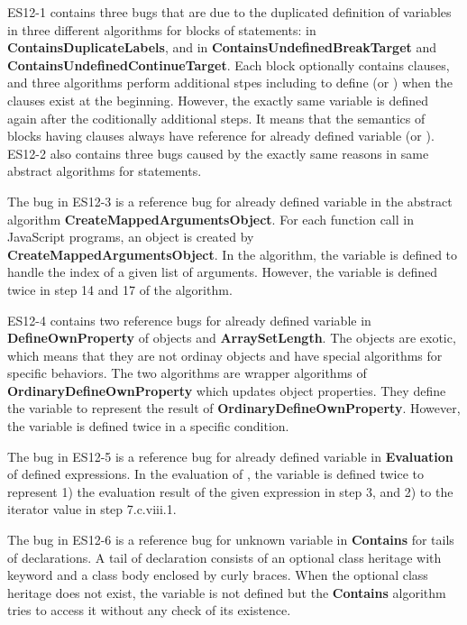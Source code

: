 ES12-1 contains three bugs that are due to the duplicated definition of
variables in three different algorithms for  blocks of
 statements:  in
\textbf{ContainsDuplicateLabels}, and  in
\textbf{ContainsUndefinedBreakTarget} and
\textbf{ContainsUndefinedContinueTarget}.  Each  block optionally
contains  clauses, and three algorithms perform additional stpes
including to define  (or ) when the
clauses exist at the beginning.  However, the exactly same variable is defined
again after the coditionally additional steps.  It means that the semantics of
 blocks having  clauses always have reference for
already defined variable  (or ).
ES12-2 also contains three bugs caused by the exactly same reasons in same
abstract algorithms for  statements.

The bug in ES12-3 is a reference bug for already defined variable 
in the abstract algorithm \textbf{CreateMappedArgumentsObject}.  For each
function call in JavaScript programs, an  object is created by
\textbf{CreateMappedArgumentsObject}.  In the algorithm, the variable
 is defined to handle the index of a given list of arguments.
However, the variable is defined twice in step 14 and 17 of the algorithm.

ES12-4 contains two reference bugs for already defined variable 
in \textbf{DefineOwnProperty} of  objects and
\textbf{ArraySetLength}.  The  objects are exotic, which means
that they are not ordinay objects and have special algorithms for specific
behaviors.  The two algorithms are wrapper algorithms of
\textbf{OrdinaryDefineOwnProperty} which updates object properties.  They define
the variable  to represent the result of
\textbf{OrdinaryDefineOwnProperty}.  However, the variable is defined twice in a
specific condition.

The bug in ES12-5 is a reference bug for already defined variable 
in \textbf{Evaluation} of defined  expressions.  In the evaluation
of , the variable  is defined twice to
represent 1) the evaluation result of the given expression  in step
3, and 2) to the iterator value in step 7.c.viii.1.

The bug in ES12-6 is a reference bug for unknown variable 
in \textbf{Contains} for tails of  declarations.  A tail of
 declaration consists of an optional class heritage with
 keyword and a class body enclosed by curly braces.  When the
optional class heritage does not exist, the variable  is not
defined but the \textbf{Contains} algorithm tries to access it without any check
of its existence.

